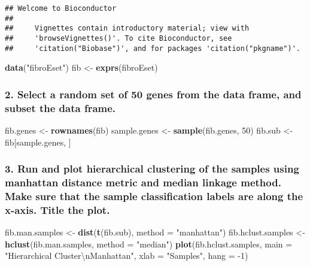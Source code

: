 \documentclass[]{article}
\newenvironment{Shaded}{\begin{snugshade}}{\end{snugshade}}
\newcommand{\KeywordTok}[1]{\textcolor[rgb]{0.13,0.29,0.53}{\textbf{{#1}}}}
\newcommand{\DataTypeTok}[1]{\textcolor[rgb]{0.13,0.29,0.53}{{#1}}}
\newcommand{\DecValTok}[1]{\textcolor[rgb]{0.00,0.00,0.81}{{#1}}}
\newcommand{\CharTok}[1]{\textcolor[rgb]{0.31,0.60,0.02}{{#1}}}
\newcommand{\StringTok}[1]{\textcolor[rgb]{0.31,0.60,0.02}{{#1}}}
\newcommand{\NormalTok}[1]{{#1}}
\begin{document}
\begin{verbatim}
## Welcome to Bioconductor
## 
##     Vignettes contain introductory material; view with
##     'browseVignettes()'. To cite Bioconductor, see
##     'citation("Biobase")', and for packages 'citation("pkgname")'.
\end{verbatim}

\begin{Shaded}
\begin{Highlighting}[]
\KeywordTok{data}\NormalTok{(}\StringTok{"fibroEset"}\NormalTok{)}
\NormalTok{fib <-}\StringTok{ }\KeywordTok{exprs}\NormalTok{(fibroEset)}
\end{Highlighting}
\end{Shaded}

\subsubsection{2. Select a random set of 50 genes from the data frame,
and subset the data
frame.}\label{select-a-random-set-of-50-genes-from-the-data-frame-and-subset-the-data-frame.}

\begin{Shaded}
\begin{Highlighting}[]
\NormalTok{fib.genes <-}\StringTok{ }\KeywordTok{rownames}\NormalTok{(fib)}
\NormalTok{sample.genes <-}\StringTok{ }\KeywordTok{sample}\NormalTok{(fib.genes, }\DecValTok{50}\NormalTok{)}
\NormalTok{fib.sub <-}\StringTok{ }\NormalTok{fib[sample.genes, ]}
\end{Highlighting}
\end{Shaded}

\newpage

\subsubsection{3. Run and plot hierarchical clustering of the samples
using manhattan distance metric and median linkage method. Make sure
that the sample classification labels are along the x-axis. Title the
plot.}\label{run-and-plot-hierarchical-clustering-of-the-samples-using-manhattan-distance-metric-and-median-linkage-method.-make-sure-that-the-sample-classification-labels-are-along-the-x-axis.-title-the-plot.}

\begin{Shaded}
\begin{Highlighting}[]
\NormalTok{fib.man.samples <-}\StringTok{ }\KeywordTok{dist}\NormalTok{(}\KeywordTok{t}\NormalTok{(fib.sub), }\DataTypeTok{method =} \StringTok{"manhattan"}\NormalTok{)}
\NormalTok{fib.hclust.samples <-}\StringTok{ }\KeywordTok{hclust}\NormalTok{(fib.man.samples, }\DataTypeTok{method =} \StringTok{"median"}\NormalTok{)}
\KeywordTok{plot}\NormalTok{(fib.hclust.samples,}
     \DataTypeTok{main =} \StringTok{"Hierarchical Cluster}\CharTok{\textbackslash{}n}\StringTok{Manhattan"}\NormalTok{,}
     \DataTypeTok{xlab =} \StringTok{"Samples"}\NormalTok{,}
     \DataTypeTok{hang =} \NormalTok{-}\DecValTok{1}\NormalTok{)}
\end{Highlighting}
\end{Shaded}
\end{document}
